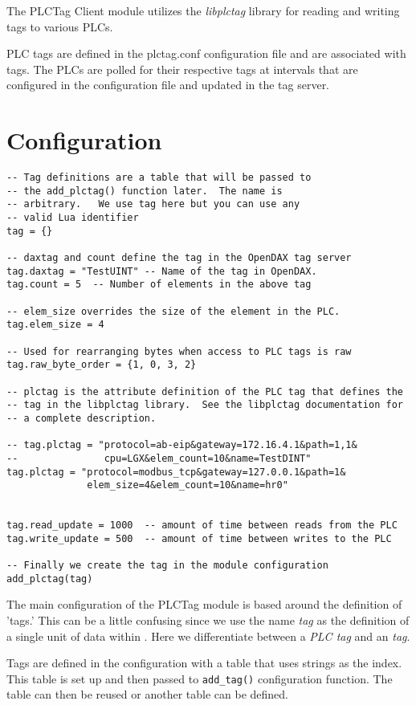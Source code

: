 The PLCTag Client module utilizes the \textit{libplctag} library for reading
and writing tags to various PLCs.

PLC tags are defined in the plctag.conf configuration file and are associated
with \opendax{} tags.  The PLCs are polled for their respective tags at intervals
that are configured in the configuration file and updated in the \opendax{}
tag server.

\section{Configuration}

\begin{verbatim}
-- Tag definitions are a table that will be passed to
-- the add_plctag() function later.  The name is
-- arbitrary.   We use tag here but you can use any
-- valid Lua identifier
tag = {}

-- daxtag and count define the tag in the OpenDAX tag server
tag.daxtag = "TestUINT" -- Name of the tag in OpenDAX.
tag.count = 5  -- Number of elements in the above tag

-- elem_size overrides the size of the element in the PLC.
tag.elem_size = 4

-- Used for rearranging bytes when access to PLC tags is raw
tag.raw_byte_order = {1, 0, 3, 2}

-- plctag is the attribute definition of the PLC tag that defines the
-- tag in the libplctag library.  See the libplctag documentation for
-- a complete description. 

-- tag.plctag = "protocol=ab-eip&gateway=172.16.4.1&path=1,1&
--               cpu=LGX&elem_count=10&name=TestDINT"
tag.plctag = "protocol=modbus_tcp&gateway=127.0.0.1&path=1&
              elem_size=4&elem_count=10&name=hr0"


tag.read_update = 1000  -- amount of time between reads from the PLC
tag.write_update = 500  -- amount of time between writes to the PLC

-- Finally we create the tag in the module configuration
add_plctag(tag)
\end{verbatim}

The main configuration of the PLCTag module is based around the 
definition of 'tags.'  This can be a little confusing since we
use the name \textit{tag} as the definition of a single unit of
data within \opendax{}.  Here we differentiate between a \textit{PLC tag} and
an \opendax{} \textit{tag}.

Tags are defined in the configuration with a table that uses
strings as the index.  This table is set up and then passed to
\texttt{add\_tag()} configuration function.  The table can then
be reused or another table can be defined.

